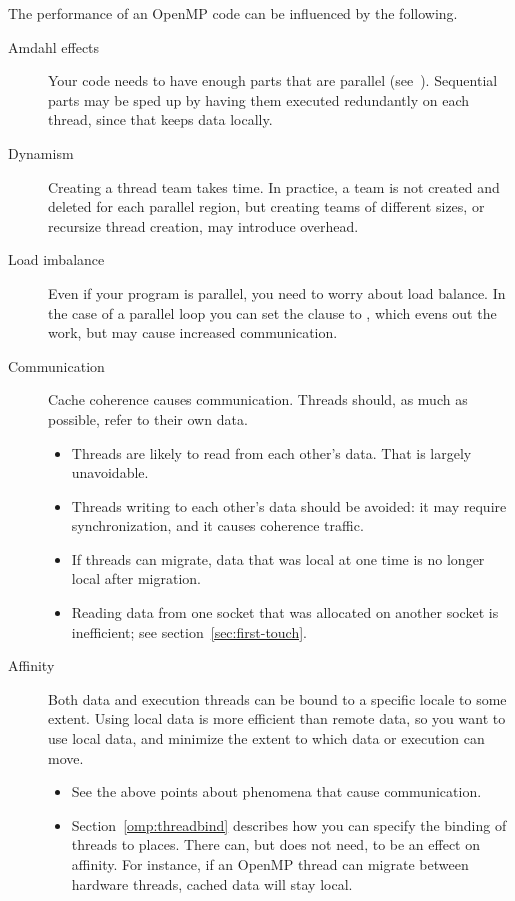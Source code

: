 The performance of an OpenMP code can be influenced by the following.

\begin{description}
\item[Amdahl effects] Your code needs to have enough parts that are
  parallel (see~). Sequential parts may be sped up
  by having them executed redundantly on each thread, since that keeps
  data locally.
\item[Dynamism] Creating a thread team takes time. In practice, a team
  is not created and deleted for each parallel region, but creating
  teams of different sizes, or recursize thread creation, may
  introduce overhead.
\item[Load imbalance] Even if your program is parallel, you need to
  worry about load balance. In the case of a parallel loop you can set
  the  clause to , which evens out
  the work, but may cause increased communication.
\item[Communication] Cache coherence causes communication. Threads
  should, as much as possible, refer to their own data.
  \begin{itemize}
  \item Threads are likely to read from each other's data. That is
    largely unavoidable.
  \item Threads writing to each other's data should be avoided: it may
    require synchronization, and it causes coherence traffic.
  \item If threads can migrate, data that was local at one time is no
    longer local after migration.
  \item Reading data from one socket that was allocated on another
    socket is inefficient; see section~\ref{sec:first-touch}.
  \end{itemize}
\item[Affinity] Both data and execution threads can be bound to a
  specific locale to some extent. Using local data is more efficient
  than remote data, so you want to use local data, and minimize the extent to which data
  or execution can move.
  \begin{itemize}
  \item See the above points about phenomena that cause communication.
  \item Section~\ref{omp:threadbind} describes how you can specify the
    binding of threads to places. There can, but does not need, to be
    an effect on affinity. For instance, if an OpenMP thread can
    migrate between hardware threads, cached data will stay local.

\end{itemize}
\end{description}
